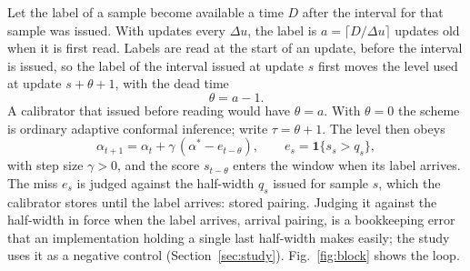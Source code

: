 Let the label of a sample become available a time $D$ after the interval for that sample was
issued. With updates every $\Delta u$, the label is $a = \lceil D/\Delta u \rceil$ updates old when
it is first read. Labels are read at the start of an update, before the interval is issued, so the
label of the interval issued at update $s$ first moves the level used at update $s+\theta+1$, with
the dead time
\begin{equation}
  \theta = a - 1 .
  \label{eq:theta}
\end{equation}
A calibrator that issued before reading would have $\theta = a$. With $\theta = 0$ the scheme is
ordinary adaptive conformal inference; \citet{elhalabi2026} write $\tau = \theta + 1$. The level
then obeys
\begin{equation}
  \alpha_{t+1} = \alpha_t + \gamma\,(\alpha^\ast - e_{t-\theta}),
  \qquad e_s = \mathbf{1}\{s_s > q_s\},
  \label{eq:loop}
\end{equation}
with step size $\gamma > 0$, and the score $s_{t-\theta}$ enters the window when its label
arrives. The miss $e_s$ is judged against the half-width $q_s$ issued for sample $s$, which the
calibrator stores until the label arrives: stored pairing. Judging it against the half-width in
force when the label arrives, arrival pairing, is a bookkeeping error that an implementation
holding a single last half-width makes easily; the study uses it as a negative control
(Section~\ref{sec:study}). Fig.~\ref{fig:block} shows the loop.

